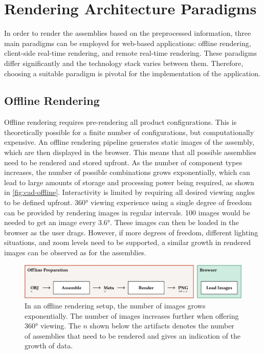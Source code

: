 \section{Rendering Architecture Paradigms}

In order to render the assemblies based on the preprocessed information, three main paradigms can be employed for web-based applications: offline rendering, client-side real-time rendering, and remote real-time rendering. These paradigms differ significantly and the technology stack varies between them. Therefore, choosing a suitable paradigm is pivotal for the implementation of the application.

\subsection*{Offline Rendering}

Offline rendering requires pre-rendering all product configurations. This is theoretically possible for a finite number of configurations, but computationally expensive. An offline rendering pipeline generates static images of the assembly, which are then displayed in the browser. This means that all possible assemblies need to be rendered and stored upfront. As the number of component types increases, the number of possible combinations grows exponentially, which can lead to large amounts of storage and processing power being required, as shown in \autoref{fig:cad-offline}. Interactivity is limited by requiring all desired viewing angles to be defined upfront. 360° viewing experience using a single degree of freedom can be provided by rendering images in regular intervals. 100 images would be needed to get an image every 3.6°. These images can then be loaded in the browser as the user drags. However, if more degrees of freedom, different lighting situations, and zoom levels need to be supported, a similar growth in rendered images can be observed as for the assemblies.

\begin{figure}[H]
  \includegraphics[width=\columnwidth]{resources/cad-pipeline-offline.png}
  \caption{In an offline rendering setup, the number of images grows exponentially. The number of images increases further when offering 360° viewing. The $n$ shown below the artifacts denotes the number of assemblies that need to be rendered and gives an indication of the growth of data.}
  \label{fig:cad-offline}
\end{figure}


